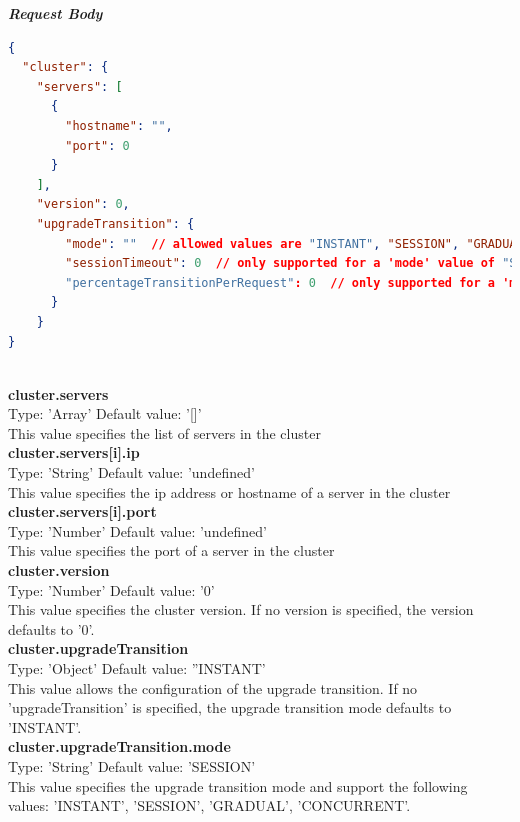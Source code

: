 \documentclass[a4paper,11pt,twoside]{article}
\begin{document}
\noindent
\textit{\textbf{Request Body}}
 
\begin{lstlisting}[language=json,firstnumber=1]
{
  "cluster": {
    "servers": [
      {
        "hostname": "",
        "port": 0
      }
    ],
    "version": 0,
    "upgradeTransition": {
        "mode": ""  // allowed values are "INSTANT", "SESSION", "GRADUAL", "CONCURRENT"
        "sessionTimeout": 0  // only supported for a 'mode' value of "SESSION" 
        "percentageTransitionPerRequest": 0  // only supported for a 'mode' value of "GRADUAL"
      }
    }
}
\end{lstlisting}
\noindent \\
\textbf{cluster.servers}\\
\noindent
Type: 'Array'  Default value: '[]'\\
\noindent
This value specifies the list of servers in the cluster\\

\noindent
\textbf{cluster.servers[i].ip}\\
\noindent
Type: 'String' Default value: 'undefined'\\
\noindent
This value specifies the ip address or hostname of a server in the cluster\\

\noindent
\textbf{cluster.servers[i].port}\\
\noindent
Type: 'Number' Default value: 'undefined'\\
\noindent
This value specifies the port of a server in the cluster\\

\noindent
\textbf{cluster.version}\\
\noindent
Type: 'Number' Default value: '0'\\
\noindent
This value specifies the cluster version. If no version is specified, the version defaults to '0'. \\

\noindent
\textbf{cluster.upgradeTransition}\\
\noindent
Type: 'Object' Default value: ''INSTANT'\\
\noindent
This value allows the configuration of the upgrade transition. If no 'upgradeTransition' is specified, the upgrade transition mode defaults to 'INSTANT'.\\

\noindent
\textbf{cluster.upgradeTransition.mode}\\
\noindent
Type: 'String' Default value: 'SESSION'\\
\noindent
This value specifies the upgrade transition mode and support the following values: 'INSTANT', 'SESSION', 'GRADUAL', 'CONCURRENT'.\\
\end{document}
